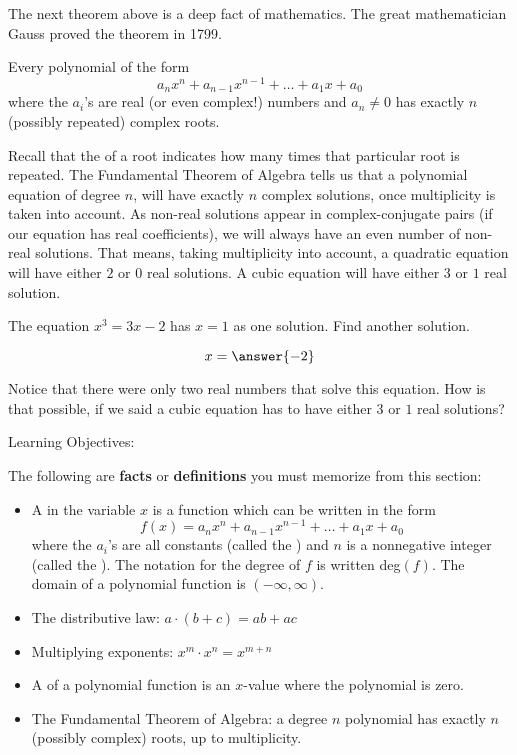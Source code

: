 \documentclass{ximera}
\begin{document}
The next theorem above is a deep fact of mathematics. The great mathematician Gauss proved the theorem in 1799. 
\begin{theorem}
  Every polynomial of the form
  \[
  a_n x^n + a_{n-1} x^{n-1} + \dots + a_1 x + a_0
  \]
  where the $a_i$'s are real (or even complex!) numbers and $a_n \ne 0$ has exactly
  $n$ (possibly repeated) complex roots.
\end{theorem}

Recall that the  of a root indicates how many times that particular root is repeated.
The Fundamental Theorem of Algebra tells us that a polynomial equation of degree $n$, will have exactly $n$ complex solutions, once multiplicity
is taken into account.  As non-real solutions appear in complex-conjugate pairs  (if our equation has real coefficients), we will always have an even number of non-real
solutions.  That means, taking multiplicity into account, a quadratic equation will have either $2$ or $0$ real solutions.  A cubic equation will have either $3$ or $1$ real
solution.


\begin{problem}

	The equation $x^3 = 3x-2$ has $x=1$ as one solution.  Find another solution.
	
	\begin{prompt}
		\[ x= \answer{-2} \]
	\end{prompt}
	\begin{feedback}
  		Notice that there were only two real numbers that solve this equation.  How is that possible, if we said a cubic equation has to have either
		$3$ or $1$ real solutions?
  	\end{feedback}
\end{problem}

Learning Objectives:

The following are \textbf{facts} or \textbf{definitions} you must memorize from this section:
\begin{itemize}
\item A  in the variable $x$ is a function
  which can be written in the form
  \[
  f(x) = a_nx^n + a_{n-1}x^{n-1} + \dots + a_1 x + a_0
  \]
  where the $a_i$'s are all constants (called the )
  and $n$ is a nonnegative integer (called the ). The notation for the degree of $f$ is written deg$(f)$. The domain of a polynomial function is $(-\infty,\infty)$.
\item The distributive law: $\displaystyle a\cdot( b + c ) = ab + ac$
\item Multiplying exponents: $x^m\cdot x^n = x^{m+n}$
\item A  of a polynomial function is an $x$-value where the polynomial is zero. 
\item The Fundamental Theorem of Algebra: a degree $n$ polynomial has exactly $n$ (possibly complex) roots, up to multiplicity.
\end{itemize}
\end{document}

